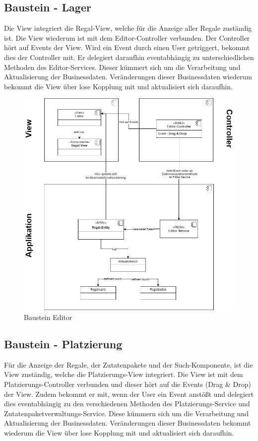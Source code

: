 \subsection{Baustein - Lager}
Die View integriert die Regal-View, welche für die Anzeige aller Regale zuständig ist. Die View wiederum ist mit dem
Editor-Controller verbunden. Der Controller hört auf Events der View. Wird ein Event durch einen User getriggert,
bekommt dies der Controller mit. Er delegiert daraufhin eventabhängig zu unterschiedlichen Methoden des
Editor-Services. Dieser kümmert sich um die Verarbeitung und Aktualisierung der Businessdaten. Veränderungen dieser
Businessdaten wiederum bekommt die View über lose Kopplung mit und aktualisiert sich daraufhin.

\begin{figure}[H]
    \centering
    \includegraphics[width=1\textwidth]{Bilder/Kapitel/Bausteinsicht/Baustein_Editor}
    \caption{Baustein Editor}
    \label{fig:Baustein_Editor}
\end{figure}

\subsection{Baustein - Platzierung}
Für die Anzeige der Regale, der Zutatenpakete und der Such-Komponente, ist die View zuständig, welche die Platzierungs-View
integriert. Die View ist mit dem Platzierungs-Controller verbunden und dieser hört auf die Events (Drag \& Drop) der View.
Zudem bekommt er mit, wenn der User ein Event anstößt und delegiert dies eventabhängig zu den verschiedenen Methoden des
Platzierungs-Service und Zutatenpaketverwaltungs-Service. Diese kümmern sich um die Verarbeitung und Aktualisierung der
Businessdaten. Veränderungen dieser Businessdaten bekommt wiederum die View über lose Kopplung mit und aktualisiert sich daraufhin.


